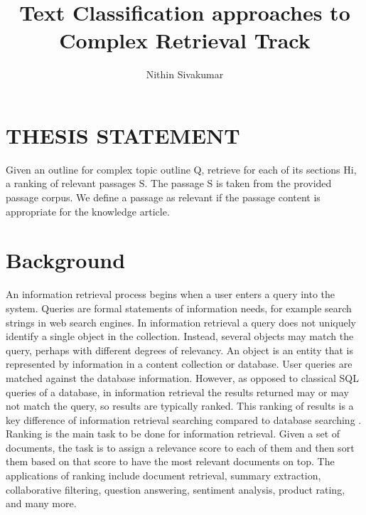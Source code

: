 \documentclass[conference]{IEEEtran}
\title{Text Classification approaches to Complex Retrieval Track}
\author{Nithin Sivakumar}
\begin{document}
\maketitle



 \section*{THESIS STATEMENT}
Given an outline for complex topic outline Q, retrieve for each of its sections Hi, a ranking of relevant passages
S. The passage S is taken from the provided passage corpus. We define a passage as relevant if the
passage content is appropriate for the knowledge article.

\section*{Background} An information retrieval process begins when a user enters a query into the system. Queries are formal statements
of information needs, for example search strings in web search engines. In information retrieval a query does not
uniquely identify a single object in the collection. Instead, several objects may match the query, perhaps with
different degrees of relevancy. An object is an entity that is represented by information in a content collection
or database. User queries are matched against the database information. However, as opposed to classical SQL
queries of a database, in information retrieval the results returned may or may not match the query, so results
are typically ranked. This ranking of results is a key difference of information retrieval searching compared
to database searching \cite{manning}. Ranking is the main task to be done for information retrieval. Given a
set of documents, the task is to assign a relevance score to each of them and then sort them based on that
score to have the most relevant documents on top. The applications of ranking include document retrieval,
summary extraction, collaborative filtering, question answering, sentiment analysis, product rating, and many
more. 
\end{document}
